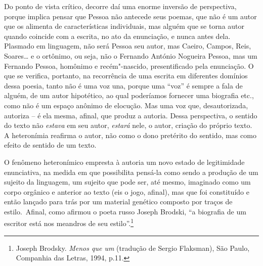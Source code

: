 Do ponto de vista crítico, decorre daí uma enorme inversão de
perspectiva, porque implica pensar que Pessoa não antecede seus poemas,
que não é um autor que os alimenta de características individuais, mas
alguém que se torna autor quando coincide com a escrita, no ato da
enunciação, e nunca antes dela. Plasmado em linguagem, não será Pessoa
seu autor, mas Caeiro, Campos, Reis, Soares\ldots{} e o ortônimo, ou seja, não o Fernando António Nogueira Pessoa, mas um Fernando Pessoa, homônimo
e recém"-nascido, presentificado pela enunciação. O que se verifica,
portanto, na recorrência de uma escrita em diferentes domínios dessa
poesia, tanto não é uma voz una, porque uma ``voz'' é sempre a fala de
alguém, de um autor hipotético, ao qual poderíamos fornecer uma
biografia etc., como não é um espaço anônimo de elocução. Mas uma voz
que, desautorizada, autoriza -- é ela mesma, afinal, que produz a
autoria. Dessa perspectiva, o sentido do texto não \emph{estava} em seu
autor, \emph{estará} nele, o autor, criação do próprio texto. A
heteronímia reafirma o autor, não como o dono pretérito do sentido, mas
como efeito de sentido de um texto.

O fenômeno heteronímico empresta à autoria um novo estado de
legitimidade enunciativa, na medida em que possibilita pensá-la como
sendo a produção de um sujeito da linguagem, um sujeito que pode ser,
até mesmo, imaginado como um corpo orgânico e anterior ao texto (eis o
jogo, afinal), mas que foi constituído e então lançado para trás por um
material genético composto por traços de estilo.~Afinal, como afirmou o
poeta russo Joseph Brodski, ``a biografia de um escritor está nos
meandros de seu estilo''.\footnote{Joseph Brodsky. \emph{Menos que um}
  (tradução de Sergio Flaksman), São Paulo, Companhia das Letras, 1994,
  p.11.}

